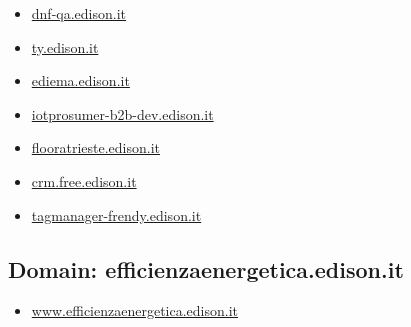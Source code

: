 \documentclass{article}
\begin{document}
\begin{itemize}
                
                \item \href{ https://dnf-qa.edison.it/}{ dnf-qa.edison.it }
            
                
                \item \href{ https://ty.edison.it/}{ ty.edison.it }
            
                
                \item \href{ http://ediema.edison.it/}{ ediema.edison.it }
            
                
                \item \href{ http://iotprosumer-b2b-dev.edison.it/}{ iotprosumer-b2b-dev.edison.it }
            
                
                \item \href{ http://flooratrieste.edison.it/}{ flooratrieste.edison.it }
            
                
                \item \href{ http://crm.free.edison.it/}{ crm.free.edison.it }
            
                
                \item \href{ http://tagmanager-frendy.edison.it/}{ tagmanager-frendy.edison.it }
            
        
    \end{itemize}

    \subsection{Domain: efficienzaenergetica.edison.it}
    \begin{itemize}
        
            
                
                \item \href{ https://www.efficienzaenergetica.edison.it/}{ www.efficienzaenergetica.edison.it }
            
        
    \end{itemize}
\end{document}
